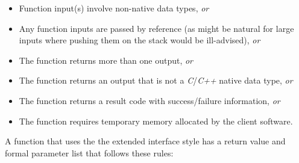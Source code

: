 \begin{itemize}
\item Function input(s) involve non-native data types,
      \emph{or}
\item Any function inputs are passed by reference (as might
      be natural for large inputs where pushing them on the 
      stack would be ill-advised), \emph{or}
\item The function returns more than one output, \emph{or}
\item The function returns an output that is not a
      \emph{C}/\emph{C++} native data type, \emph{or}
\item The function returns a result code with
      success/failure information, \emph{or}
\item The function requires temporary memory
      allocated by the client software.
\end{itemize}

A function that uses the the extended interface style has a 
return value and formal parameter list that follows these 
rules: 


